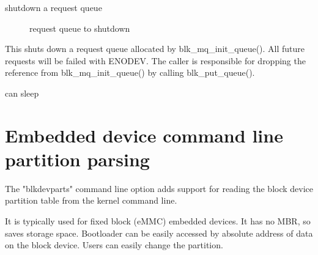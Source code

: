 \documentclass[a4paper,11pt,english]{sphinxmanual}
\begin{document}
\begin{fulllineitems}
\label{\detokenize{blk-mq:c.blk_mq_destroy_queue}}
shutdown a request queue

\end{fulllineitems}


\begin{description}
\item[{}] \leavevmode
request queue to shutdown

\end{description}


This shuts down a request queue allocated by blk\_mq\_init\_queue(). All future
requests will be failed with \sphinxhyphen{}ENODEV. The caller is responsible for dropping
the reference from blk\_mq\_init\_queue() by calling blk\_put\_queue().


can sleep


\chapter{Embedded device command line partition parsing}
\label{\detokenize{cmdline-partition:embedded-device-command-line-partition-parsing}}\label{\detokenize{cmdline-partition::doc}}
The "blkdevparts" command line option adds support for reading the
block device partition table from the kernel command line.

It is typically used for fixed block (eMMC) embedded devices.
It has no MBR, so saves storage space. Bootloader can be easily accessed
by absolute address of data on the block device.
Users can easily change the partition.
\end{document}
